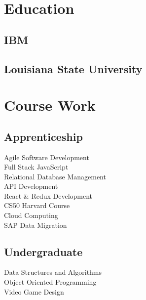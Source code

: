 \documentclass[]{deedy-resume-openfont}
\begin{document}
\begin{minipage}[t]{0.33\textwidth}

\section{Education} 

\subsection{IBM}
\sectionsep

\subsection{Louisiana State University}
\sectionsep
\section{Course Work}

\subsection{Apprenticeship}
Agile Software Development  \\
Full Stack JavaScript \\
Relational Database Management \\
API Development \\
React & Redux Development \\
CS50 Harvard Course \\
Cloud Computing \\
SAP Data Migration \\
\vspace{\topsep} %
\subsection{Undergraduate}
Data Structures and Algorithms \\
Object Oriented Programming  \\
Video Game Design \\

%
%

\end{minipage} 
\end{document}
